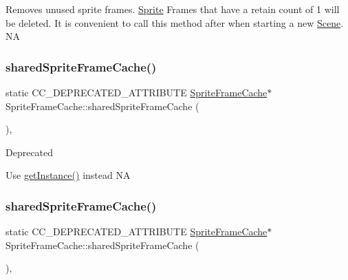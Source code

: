 Removes unused sprite frames. \hyperlink{classSprite}{Sprite} Frames that have a retain count of 1 will be deleted. It is convenient to call this method after when starting a new \hyperlink{classScene}{Scene}.  NA \mbox{\label{classSpriteFrameCache_ae6820c8de5c9a514a1702af512c547d7}} 
\subsubsection{\texorpdfstring{shared\+Sprite\+Frame\+Cache()}{sharedSpriteFrameCache()}\hspace{0.1cm}{\footnotesize\ttfamily [1/2]}}
{\footnotesize\ttfamily static C\+C\+\_\+\+D\+E\+P\+R\+E\+C\+A\+T\+E\+D\+\_\+\+A\+T\+T\+R\+I\+B\+U\+TE \hyperlink{classSpriteFrameCache}{Sprite\+Frame\+Cache}$\ast$ Sprite\+Frame\+Cache\+::shared\+Sprite\+Frame\+Cache (\begin{DoxyParamCaption}{ }\end{DoxyParamCaption})\hspace{0.3cm}{\ttfamily [inline]}, {\ttfamily [static]}}

\begin{DoxyRefDesc}{Deprecated}
\item[\hyperlink{deprecated__deprecated000044}{Deprecated}]Use \hyperlink{classSpriteFrameCache_afc6f3a882c36cfd48e4b450a6fcbf535}{get\+Instance()} instead  NA \end{DoxyRefDesc}
\mbox{\label{classSpriteFrameCache_ae6820c8de5c9a514a1702af512c547d7}} 
\subsubsection{\texorpdfstring{shared\+Sprite\+Frame\+Cache()}{sharedSpriteFrameCache()}\hspace{0.1cm}{\footnotesize\ttfamily [2/2]}}
{\footnotesize\ttfamily static C\+C\+\_\+\+D\+E\+P\+R\+E\+C\+A\+T\+E\+D\+\_\+\+A\+T\+T\+R\+I\+B\+U\+TE \hyperlink{classSpriteFrameCache}{Sprite\+Frame\+Cache}$\ast$ Sprite\+Frame\+Cache\+::shared\+Sprite\+Frame\+Cache (\begin{DoxyParamCaption}{ }\end{DoxyParamCaption})\hspace{0.3cm}{\ttfamily [inline]}, {\ttfamily [static]}}

